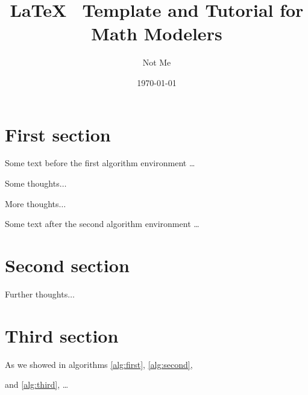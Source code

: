 \documentclass[12pt]{article}   %
\title{LaTeX \, Template and Tutorial for Math Modelers}
\author{Not Me}
\date{\today}
\begin{document}
\section{First section}

Some text before the first algorithm environment \ldots

\begin{theorem}[Text]
Some thoughts$\ldots$ \label{alg:first}
\end{theorem}

\begin{theorem}
More thoughts$\ldots$ \label{alg:second}
\end{theorem}

Some text after the second algorithm environment \ldots

\section{Second section}

\begin{theorem}
Further thoughts$\ldots$ \label{alg:third}
\end{theorem}

\section{Third section}

As we showed in algorithms \ref{alg:first}, \ref{alg:second}, 

and \ref{alg:third}, \ldots 
\end{document}
